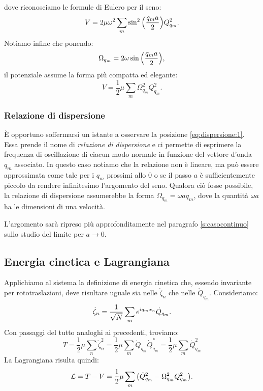             dove riconosciamo le formule di Eulero per il seno:
                $$V=2\mu\omega^2\sum_m\sin^2\qty(\frac{q_ma}{2})Q_{q_m}^2.$$
            Notiamo infine che ponendo:
            \begin{equation}
                \Omega_{q_m}=2\omega\sin\qty(\frac{q_ma}{2}),
                \label{eq:dispersione:1}
            \end{equation}
            il potenziale assume la forma pi\`u compatta ed elegante:
            \begin{equation}
                V=\frac{1}{2}\mu\sum_m\Omega_{q_m}^2Q_{q_m}^2.
                \label{eq:potenziale:3}
            \end{equation}
        \subsubsection{Relazione di dispersione}
            \`E opportuno soffermarsi un istante a osservare la posizione \eqref{eq:dispersione:1}. Essa prende il nome di \emph{relazione di dispersione} e ci permette di esprimere la frequenza di oscillazione di ciacun modo normale in funzione del vettore d'onda $q_m$ associato. In questo caso notiamo che la relazione non \`e lineare, ma pu\`o essere approssimata come tale per i $q_m$ prossimi allo $0$ o se il passo $a$ \`e sufficientemente piccolo da rendere infinitesimo l'argomento del seno. Qualora ci\`o fosse possibile, la relazione di dispersione assumerebbe la forma $\Omega_{q_m}=\omega aq_m$, dove la quantit\`a $\omega a$ ha le dimensioni di una velocit\`a.
            \par L'argomento sar\`a ripreso pi\`u approfonditamente nel paragrafo \ref{s:casocontinuo} sullo studio del limite per $a\to 0$.
    \subsection{Energia cinetica e Lagrangiana}
        Applichiamo al sistema la definizione di energia cinetica che, essendo invariante per rototraslazioni, deve risultare uguale sia nelle $\dot{\zeta}_n$ che nelle $\dot{Q}_{q_m}$. Consideriamo:
            $$\dot{\zeta}_n=\frac{1}{\sqrt{N}}\sum_me^{iq_mx_n}\dot{Q}_{q_m}.$$
        Con passaggi del tutto analoghi ai precedenti, troviamo:
            $$T=\frac{1}{2}\mu\sum_n\dot{\zeta}_n^2=\frac{1}{2}\mu\sum_m\dot{Q}_{q_m}\dot{Q}^*_{q_m}=\frac{1}{2}\mu\sum_m\dot{Q}_{q_m}^2$$
        La Lagrangiana risulta quindi:
        \begin{equation}
            \mathcal{L}=T-V=\frac{1}{2}\mu\sum_m\qty(\dot{Q}_{q_m}^2-\Omega_{q_m}^2Q_{q_m}^2).
            \label{eq:mollelagrangiana}
        \end{equation}
